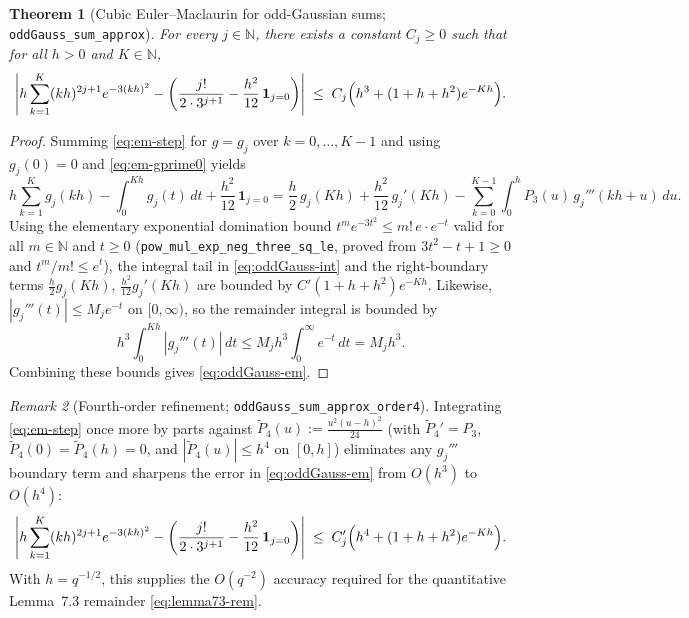 \documentclass[11pt,a4paper]{article}
\numberwithin{equation}{section}
\theoremstyle{plain}
\newtheorem{theorem}{Theorem}[section]
\theoremstyle{definition}
\theoremstyle{remark}
\newtheorem{remark}[theorem]{Remark}
\newcommand{\N}{\mathbb{N}}
\newcommand{\code}[1]{\texttt{\small #1}}
\begin{document}
\begin{theorem}[Cubic Euler--Maclaurin for odd-Gaussian sums; \code{oddGauss\_sum\_approx}]
\label{thm:em}
For every $j\in\N$, there exists a constant $C_j\ge 0$ such that for all $h>0$ and $K\in\N$,
\begin{equation}\label{eq:oddGauss-em}
  \left|h\sum_{k=1}^{K} (kh)^{2j+1}e^{-3(kh)^2} - \left(\frac{j!}{2\cdot 3^{j+1}} - \frac{h^2}{12}\,\mathbf{1}_{j=0}\right)\right|
  \;\le\; C_j\Bigl(h^3 + (1+h+h^2)e^{-Kh}\Bigr).
\end{equation}
\end{theorem}

\begin{proof}
Summing \eqref{eq:em-step} for $g=g_j$ over $k=0,\dots,K-1$ and using $g_j(0)=0$ and \eqref{eq:em-gprime0} yields
\[
  h\sum_{k=1}^{K} g_j(kh) - \int_0^{Kh} g_j(t)\,dt + \frac{h^2}{12}\,\mathbf{1}_{j=0}
  = \frac{h}{2}\,g_j(Kh) + \frac{h^2}{12}\,g_j'(Kh) - \sum_{k=0}^{K-1}\int_0^h P_3(u)\,g_j'''(kh+u)\,du.
\]
Using the elementary exponential domination bound $t^m e^{-3t^2} \le m!\,e\cdot e^{-t}$ valid for all $m\in\N$ and $t\ge 0$ (\code{pow\_mul\_exp\_neg\_three\_sq\_le}, proved from $3t^2-t+1\ge 0$ and $t^m/m!\le e^t$), the integral tail in \eqref{eq:oddGauss-int} and the right-boundary terms $\frac{h}{2}g_j(Kh)$, $\frac{h^2}{12}g_j'(Kh)$ are bounded by $C'(1+h+h^2)e^{-Kh}$. Likewise, $|g_j'''(t)|\le M_j e^{-t}$ on $[0,\infty)$, so the remainder integral is bounded by
\[
  h^3\int_0^{Kh} |g_j'''(t)|\,dt \le M_j h^3\int_0^\infty e^{-t}\,dt = M_j h^3.
\]
Combining these bounds gives \eqref{eq:oddGauss-em}.
\end{proof}

\begin{remark}[Fourth-order refinement; \code{oddGauss\_\allowbreak sum\_\allowbreak approx\_\allowbreak order4}]
\label{rem:em-order4}
Integrating \eqref{eq:em-step} once more by parts against $\tilde{P}_4(u):=\frac{u^2(u-h)^2}{24}$ (with $\tilde{P}_4'=P_3$, $\tilde{P}_4(0)=\tilde{P}_4(h)=0$, and $|\tilde{P}_4(u)|\le h^4$ on $[0,h]$) eliminates any $g_j'''$ boundary term and sharpens the error in \eqref{eq:oddGauss-em} from $O(h^3)$ to $O(h^4)$:
\[
  \left|h\sum_{k=1}^{K} (kh)^{2j+1}e^{-3(kh)^2} - \left(\frac{j!}{2\cdot 3^{j+1}} - \frac{h^2}{12}\,\mathbf{1}_{j=0}\right)\right|
  \;\le\; C_j'\Bigl(h^4 + (1+h+h^2)e^{-Kh}\Bigr).
\]
With $h=q^{-1/2}$, this supplies the $O(q^{-2})$ accuracy required for the quantitative Lemma~7.3 remainder \eqref{eq:lemma73-rem}.
\end{remark}
\end{document}
